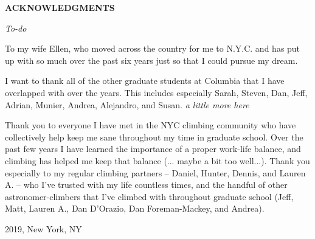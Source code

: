 %
%
%
%

\newpage

\begin{center}

{\large \bf ACKNOWLEDGMENTS } %

\end{center}

\vspace{0.8cm}
\textit{To-do}

To my wife Ellen, who moved across the country for me to N.Y.C. and has put up
with so much over the past six years just so that I could pursue my dream. 

I want to thank all of the other graduate students at Columbia that I have overlapped
with over the years. This includes especially Sarah, Steven, Dan, Jeff, Adrian,
Munier, Andrea, Alejandro, and Susan. \textit{a little more here}

Thank you to everyone I have met in the NYC climbing community who have collectively
help keep me sane throughout my time in graduate school. Over the past few years
I have learned the importance of a proper work-life balance, and climbing has helped
me keep that balance (... maybe a bit too well...). Thank you especially to my
regular climbing partners -- Daniel, Hunter, Dennis, and Lauren A. -- who I've trusted
with my life countless times, and the handful of other astronomer-climbers that I've
climbed with throughout graduate school (Jeff, Matt, Lauren A., Dan D'Orazio,
Dan Foreman-Mackey, and Andrea).

\vspace{1.8cm}
2019, New York, NY


